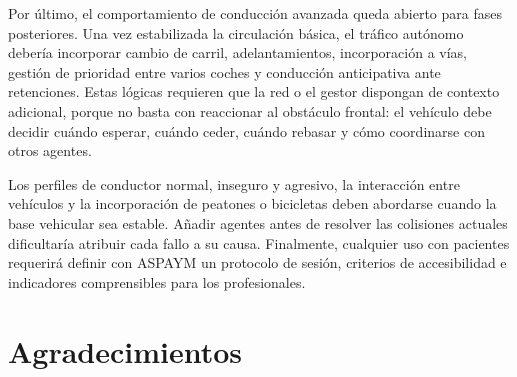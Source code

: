 Por último, el comportamiento de conducción avanzada queda abierto para fases posteriores. Una vez estabilizada la circulación básica, el tráfico autónomo debería incorporar cambio de carril, adelantamientos, incorporación a vías, gestión de prioridad entre varios coches y conducción anticipativa ante retenciones. Estas lógicas requieren que la red o el gestor dispongan de contexto adicional, porque no basta con reaccionar al obstáculo frontal: el vehículo debe decidir cuándo esperar, cuándo ceder, cuándo rebasar y cómo coordinarse con otros agentes.

Los perfiles de conductor normal, inseguro y agresivo, la interacción entre vehículos y la incorporación de peatones o bicicletas deben abordarse cuando la base vehicular sea estable. Añadir agentes antes de resolver las colisiones actuales dificultaría atribuir cada fallo a su causa. Finalmente, cualquier uso con pacientes requerirá definir con ASPAYM un protocolo de sesión, criterios de accesibilidad e indicadores comprensibles para los profesionales.

\chapter*{Agradecimientos}
%
